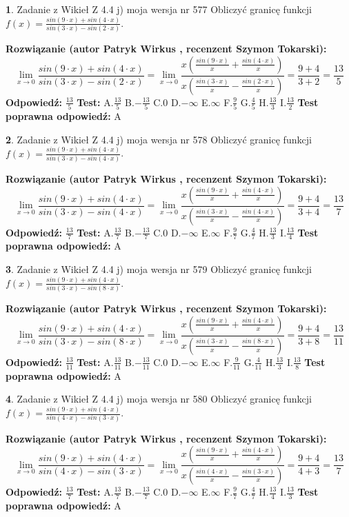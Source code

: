\documentclass[12pt, a4paper]{article}
\theoremstyle{definition} %
\newtheorem{zad}{}
\newcommand{\zadStart}[1]{\begin{zad}#1\newline}
\newcommand{\zadStop}{\end{zad}}
\newcommand{\rozwStart}[2]{\noindent \textbf{Rozwiązanie (autor #1 , recenzent #2): }\newline}
\newcommand{\rozwStop}{\newline}
\newcommand{\odpStart}{\noindent \textbf{Odpowiedź:}\newline}
\newcommand{\odpStop}{\newline}
\newcommand{\testStart}{\noindent \textbf{Test:}\newline}
\newcommand{\testStop}{\newline}
\newcommand{\kluczStart}{\noindent \textbf{Test poprawna odpowiedź:}\newline}
\newcommand{\kluczStop}{\newline}
\begin{document}
\zadStart{Zadanie z Wikieł Z 4.4 j) moja wersja nr 577}
Obliczyć granicę funkcji $f(x)=\frac{sin(9\cdot x) +sin(4\cdot x)}{sin(3\cdot x) -sin(2\cdot x)}$.
\zadStop
\rozwStart{Patryk Wirkus}{Szymon Tokarski}
$$\lim\limits_{x\to 0}\frac{sin(9\cdot x) +sin(4\cdot x)}{sin(3\cdot x) -sin(2\cdot x)}=\lim\limits_{x\to 0}\frac{x(\frac{sin(9\cdot x)}{x}+\frac{sin(4\cdot x)}{x})}{x(\frac{sin(3\cdot x)}{x}-\frac{sin(2\cdot x)}{x})}=\frac{9+4}{3+2} = \frac{13}{5}$$
\rozwStop
\odpStart
$\frac{13}{5}$
\odpStop
\testStart
A.$\frac{13}{5}$
B.$-\frac{13}{5}$
C.$0$
D.$-\infty$
E.$\infty$
F.$\frac{9}{5}$
G.$\frac{4}{5}$
H.$\frac{13}{3}$
I.$\frac{13}{2}$
\testStop
\kluczStart
A
\kluczStop



\zadStart{Zadanie z Wikieł Z 4.4 j) moja wersja nr 578}
Obliczyć granicę funkcji $f(x)=\frac{sin(9\cdot x) +sin(4\cdot x)}{sin(3\cdot x) -sin(4\cdot x)}$.
\zadStop
\rozwStart{Patryk Wirkus}{Szymon Tokarski}
$$\lim\limits_{x\to 0}\frac{sin(9\cdot x) +sin(4\cdot x)}{sin(3\cdot x) -sin(4\cdot x)}=\lim\limits_{x\to 0}\frac{x(\frac{sin(9\cdot x)}{x}+\frac{sin(4\cdot x)}{x})}{x(\frac{sin(3\cdot x)}{x}-\frac{sin(4\cdot x)}{x})}=\frac{9+4}{3+4} = \frac{13}{7}$$
\rozwStop
\odpStart
$\frac{13}{7}$
\odpStop
\testStart
A.$\frac{13}{7}$
B.$-\frac{13}{7}$
C.$0$
D.$-\infty$
E.$\infty$
F.$\frac{9}{7}$
G.$\frac{4}{7}$
H.$\frac{13}{3}$
I.$\frac{13}{4}$
\testStop
\kluczStart
A
\kluczStop



\zadStart{Zadanie z Wikieł Z 4.4 j) moja wersja nr 579}
Obliczyć granicę funkcji $f(x)=\frac{sin(9\cdot x) +sin(4\cdot x)}{sin(3\cdot x) -sin(8\cdot x)}$.
\zadStop
\rozwStart{Patryk Wirkus}{Szymon Tokarski}
$$\lim\limits_{x\to 0}\frac{sin(9\cdot x) +sin(4\cdot x)}{sin(3\cdot x) -sin(8\cdot x)}=\lim\limits_{x\to 0}\frac{x(\frac{sin(9\cdot x)}{x}+\frac{sin(4\cdot x)}{x})}{x(\frac{sin(3\cdot x)}{x}-\frac{sin(8\cdot x)}{x})}=\frac{9+4}{3+8} = \frac{13}{11}$$
\rozwStop
\odpStart
$\frac{13}{11}$
\odpStop
\testStart
A.$\frac{13}{11}$
B.$-\frac{13}{11}$
C.$0$
D.$-\infty$
E.$\infty$
F.$\frac{9}{11}$
G.$\frac{4}{11}$
H.$\frac{13}{3}$
I.$\frac{13}{8}$
\testStop
\kluczStart
A
\kluczStop



\zadStart{Zadanie z Wikieł Z 4.4 j) moja wersja nr 580}
Obliczyć granicę funkcji $f(x)=\frac{sin(9\cdot x) +sin(4\cdot x)}{sin(4\cdot x) -sin(3\cdot x)}$.
\zadStop
\rozwStart{Patryk Wirkus}{Szymon Tokarski}
$$\lim\limits_{x\to 0}\frac{sin(9\cdot x) +sin(4\cdot x)}{sin(4\cdot x) -sin(3\cdot x)}=\lim\limits_{x\to 0}\frac{x(\frac{sin(9\cdot x)}{x}+\frac{sin(4\cdot x)}{x})}{x(\frac{sin(4\cdot x)}{x}-\frac{sin(3\cdot x)}{x})}=\frac{9+4}{4+3} = \frac{13}{7}$$
\rozwStop
\odpStart
$\frac{13}{7}$
\odpStop
\testStart
A.$\frac{13}{7}$
B.$-\frac{13}{7}$
C.$0$
D.$-\infty$
E.$\infty$
F.$\frac{9}{7}$
G.$\frac{4}{7}$
H.$\frac{13}{4}$
I.$\frac{13}{3}$
\testStop
\kluczStart
A
\kluczStop
\end{document}
